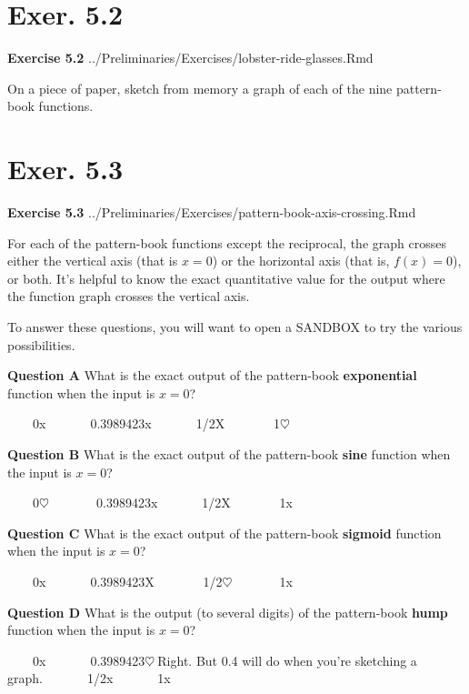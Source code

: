 \documentclass[
  letterpaper,
  DIV=11,
  numbers=noendperiod,
  oneside]{article}
\begin{document}
\begin{multicols}{2}
\hypertarget{exer.-5.2}{%
\section*{Exer. 5.2}\label{exer.-5.2}}

\textbf{Exercise 5.2}
../Preliminaries/Exercises/lobster-ride-glasses.Rmd

On a piece of paper, sketch from memory a graph of each of the nine
pattern-book functions.

\hypertarget{exer.-5.3}{%
\section*{Exer. 5.3}\label{exer.-5.3}}

\textbf{Exercise 5.3}
../Preliminaries/Exercises/pattern-book-axis-crossing.Rmd

For each of the pattern-book functions except the reciprocal, the graph
crosses either the vertical axis (that is \(x=0\)) or the horizontal
axis (that is, \(f(x) = 0\)), or both. It's helpful to know the exact
quantitative value for the output where the function graph crosses the
vertical axis.

To answer these questions, you will want to open a SANDBOX to try the
various possibilities.

\textbf{Question A} What is the exact output of the pattern-book
\textbf{exponential} function when the input is \(x=0\)?

~~~~{0{x}}~~~~~~~{0.3989423{x}}~~~~~~~{1/2{︎X
}}~~~~~~~{1{\(\heartsuit\ \)}}

\textbf{Question B} What is the exact output of the pattern-book
\textbf{sine} function when the input is \(x=0\)?

~~~~{0{\(\heartsuit\ \)}}~~~~~~~{0.3989423{x}}~~~~~~~{1/2{︎X
}}~~~~~~~{1{x}}

\textbf{Question C} What is the exact output of the pattern-book
\textbf{sigmoid} function when the input is \(x=0\)?

~~~~{0{x}}~~~~~~~{0.3989423{︎X
}}~~~~~~~{1/2{\(\heartsuit\ \)}}~~~~~~~{1{x}}

\textbf{Question D} What is the output (to several digits) of the
pattern-book \textbf{hump} function when the input is \(x=0\)?

~~~~{0{x}}~~~~~~~{0.3989423{\(\heartsuit\ \)Right. But 0.4 will do
when you're sketching a graph.}}~~~~~~~{1/2{x}}~~~~~~~{1{x}}


\end{multicols}
\end{document}

